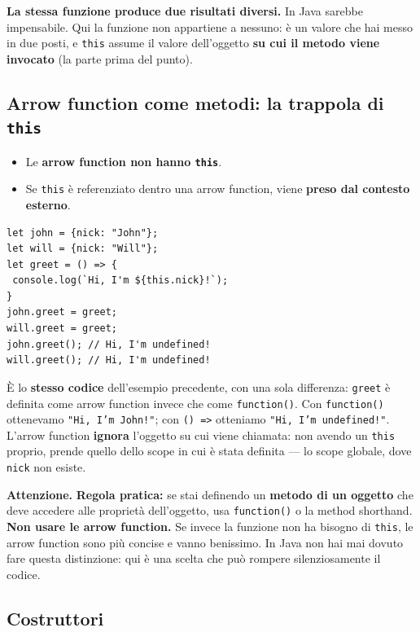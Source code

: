 \documentclass[10pt,a4paper]{article}
\newcommand{\avviso}[1]{\textbf{\textcolor{wamber}{Attenzione.}} #1}
\begin{document}
\textbf{La stessa funzione produce due risultati diversi.} In Java sarebbe impensabile. Qui la funzione non appartiene a nessuno: è un valore che hai messo in due posti, e \texttt{this} assume il valore dell'oggetto \textbf{su cui il metodo viene invocato} (la parte prima del punto).

\subsection{Arrow function come metodi: la trappola di \texttt{this}}

\begin{itemize}
  \item Le \textbf{arrow function non hanno \texttt{this}}.
  \item Se \texttt{this} è referenziato dentro una arrow function, viene \textbf{preso dal contesto esterno}.
\end{itemize}

\begin{lstlisting}[style=js]
let john = {nick: "John"};
let will = {nick: "Will"};
let greet = () => {
 console.log(`Hi, I'm ${this.nick}!`);
}
john.greet = greet;
will.greet = greet;
john.greet(); // Hi, I'm undefined!
will.greet(); // Hi, I'm undefined!
\end{lstlisting}

È lo \textbf{stesso codice} dell'esempio precedente, con una sola differenza: \texttt{greet} è definita come arrow function invece che come \texttt{function()}. Con \texttt{function()} ottenevamo \texttt{"Hi, I'm John!"}; con \texttt{() =>} otteniamo \texttt{"Hi, I'm undefined!"}. L'arrow function \textbf{ignora} l'oggetto su cui viene chiamata: non avendo un \texttt{this} proprio, prende quello dello scope in cui è stata definita --- lo scope globale, dove \texttt{nick} non esiste.

\begin{warnbox}
\avviso{\textbf{Regola pratica:} se stai definendo un \textbf{metodo di un oggetto} che deve accedere alle proprietà dell'oggetto, usa \texttt{function()} o la method shorthand. \textbf{Non usare le arrow function.} Se invece la funzione non ha bisogno di \texttt{this}, le arrow function sono più concise e vanno benissimo. In Java non hai mai dovuto fare questa distinzione: qui è una scelta che può rompere silenziosamente il codice.}
\end{warnbox}

\subsection{Costruttori}
\end{document}
